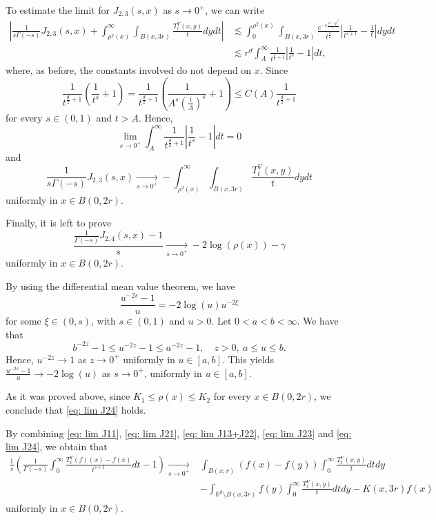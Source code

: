 \documentclass[10pt, a4paper, reqno]{amsart}
\theoremstyle{definition}
\theoremstyle{remark}
\newcommand{\RR}{\mathbb{R}}
\numberwithin{equation}{section}
\begin{document}
To estimate the limit for $J_{2,3}(s,x)$ as $s\to 0^+$, we can write
\begin{align*}
    \left|\frac{1}{s\Gamma(-s)} J_{2,3}(s,x)+\int_{\rho^2(x)}^\infty\int_{B(x,3r)}\frac{T_t^V(x,y)}{t}dydt\right|&\lesssim \int_0^{\rho^2(x)}\int_{B(x,3r)}\frac{e^{-c\frac{|x-y|^2}{t}}}{t^{\frac d2}}\left|\frac{1}{t^{s+1}}-\frac1t\right|dydt\\
    &\lesssim r^d\int_A^\infty \frac{1}{t^{\frac d2+1}}\left|\frac{1}{t^s}-1\right|dt, 
\end{align*}
where, as before, the constants involved do not depend on $x$. Since
\[ \frac{1}{t^{\frac d2+1}}\left(\frac{1}{t^s}+1\right)= \frac{1}{t^{\frac d2+1}}\left(\frac{1}{A^s\left(\frac{t}{A}\right)^s}+1\right)\leq C(A) \frac{1}{t^{\frac d2+1}}\]
for every $s\in (0,1)$ and $t>A$. Hence,
\[\lim_{s\to 0^+} \int_A^\infty \frac{1}{t^{\frac d2+1}}\left|\frac{1}{t^s}-1\right|dt=0\]
and
\begin{equation}\label{eq: lim J23}
    \frac{1}{s\Gamma(-s)} J_{2,3}(s,x)\underset{s\to 0^+}{\longrightarrow} -\int_{\rho^2(x)}^\infty\int_{B(x,3r)}\frac{T_t^V(x,y)}{t}dydt
\end{equation}
uniformly in $x\in B(0,2r)$.

Finally, it is left to prove
\begin{equation}\label{eq: lim J24}
    \frac{\frac{1}{\Gamma(-s)} J_{2,4}(s,x)-1}{s}\underset{s\to 0^+}{\longrightarrow} -2\log(\rho(x))-\gamma
\end{equation}
uniformly in $x\in B(0,2r)$. 

By using the differential mean value theorem, we have
\[\frac{u^{-2s}-1}{u}=-2\log (u) u^{-2\xi}\]
for some $\xi\in (0,s)$, with $s\in (0,1)$ and $u>0$. Let $0<a<b<\infty$. We have that
\[b^{-2z}-1\leq u^{-2z}-1\leq a^{-2z}-1, \quad z>0, \ a\leq u\leq b.\]
Hence, $u^{-2z}\to 1$ as $z\to 0^+$ uniformly in $u\in[a,b]$. This yields $\frac{u^{-2s}-1}{u}\to -2\log(u)$ as $s\to 0^+$, uniformly in $u\in[a,b]$. 

As it was proved above, since $K_1\leq \rho(x)\leq K_2$ for every $x\in B(0,2r)$, we conclude that \eqref{eq: lim J24} holds.

By combining \eqref{eq: lim J11}, \eqref{eq: lim J21}, \eqref{eq: lim J13+J22}, \eqref{eq: lim J23} and \eqref{eq: lim J24}, we obtain that
\begin{align}\label{eq: lim uniform}
    \frac1s \left(\frac{1}{\Gamma(-s)}\int_0^\infty \frac{T_t^V(f)(x)-f(x)}{t^{s+1}}dt-1\right)\underset{s\to 0^+}{\longrightarrow}& \int_{B(x,r)}(f(x)-f(y))\int_0^\infty \frac{T_t^V(x,y)}{t}dtdy\nonumber\\
    & -\int_{\RR^d\setminus B(x,3r)} f(y)\int_0^\infty \frac{T_t^V(x,y)}{t}dtdy-K(x,3r)f(x)
\end{align}
uniformly in $x\in B(0,2r)$.
\end{document}

